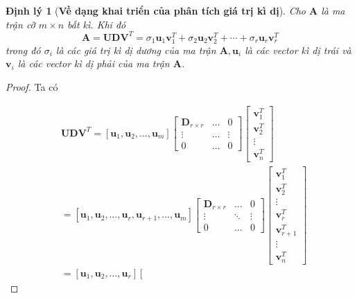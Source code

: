 \documentclass[14pt,oneside,a4paper]{report}
\newtheorem{dl}{Định lý}[section]
\numberwithin{equation}{section}
\begin{document}
\begin{dl}[\textbf{Về dạng khai triển của phân tích giá trị kì dị}] Cho $\mathbf{A}$ là ma trận cỡ $m \times n$ bất kì. Khi đó
\begin{equation} \label{eq_4}
	\mathbf{A}=\mathbf{U D V}^{T}=\sigma_{1} \mathbf{u}_{1} \mathbf{v}_{1}^{T}+\sigma_{2} \mathbf{u}_{2} \mathbf{v}_{2}^{T}+\cdots+\sigma_{r} \mathbf{u}_{r} \mathbf{v}_{r}^{T}
\end{equation}
trong đó $\sigma_{i}$ là các giá trị kì dị dương của ma trận $\mathbf{A}, \mathbf{u}_{i}$ là các vector kì dị trái và $\mathbf{v}_{i}$ là các vector kì dị phải của ma trận $\mathbf{A}$.
\end{dl}
\begin{proof}
Ta có

$$
\begin{aligned}
	& \mathbf{U D V}^{T}=\left[\mathbf{u}_{1}, \mathbf{u}_{2}, \ldots, \mathbf{u}_{m}\right]\left[\begin{array}{ccc}
		\mathbf{D}_{r \times r} & \ldots & 0 \\
		\vdots & \ldots & \vdots \\
		0 & \ldots & 0
	\end{array}\right]\left[\begin{array}{c}
		\mathbf{v}_{1}^{T} \\
		\mathbf{v}_{2}^{T} \\
		\vdots \\
		\mathbf{v}_{n}^{T}
	\end{array}\right] \\
	& =\left[\mathbf{u}_{1}, \mathbf{u}_{2}, \ldots, \mathbf{u}_{r}, \mathbf{u}_{r+1}, \ldots, \mathbf{u}_{m}\right]\left[\begin{array}{ccc}
		\mathbf{D}_{r \times r} & \ldots & 0 \\
		\vdots & \ddots & \vdots \\
		0 & \ldots & 0
	\end{array}\right]\left[\begin{array}{c}
		\mathbf{v}_{1}^{T} \\
		\mathbf{v}_{2}^{T} \\
		\vdots \\
		\mathbf{v}_{r}^{T} \\
		\mathbf{v}_{r+1}^{T} \\
		\vdots \\
		\mathbf{v}_{n}^{T}
	\end{array}\right] \\
	& \left.=\left[\mathbf{u}_{1}, \mathbf{u}_{2}, \ldots, \mathbf{u}_{r}\right]\left[\begin{array}{ccc}

\end{array}
\end{aligned}$$
\end{proof}
\end{document}
